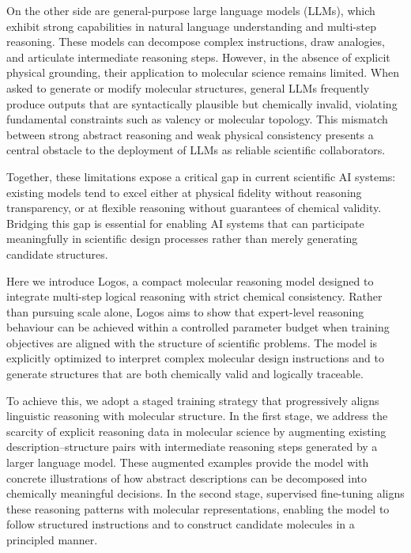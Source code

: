 \documentclass[11pt]{article}
\begin{document}
On the other side are general-purpose large language models (LLMs), which exhibit strong capabilities in natural language understanding and multi-step reasoning\cite{wei2022cot,ouyang2022instructgpt}. These models can decompose complex instructions, draw analogies, and articulate intermediate reasoning steps. However, in the absence of explicit physical grounding, their application to molecular science remains limited\cite{irwin2022chemcrow,du2024molllm}. When asked to generate or modify molecular structures, general LLMs frequently produce outputs that are syntactically plausible but chemically invalid\cite{white2023assessment}, violating fundamental constraints such as valency or molecular topology. This mismatch between strong abstract reasoning and weak physical consistency presents a central obstacle to the deployment of LLMs as reliable scientific collaborators.

Together, these limitations expose a critical gap in current scientific AI systems: existing models tend to excel either at physical fidelity without reasoning transparency, or at flexible reasoning without guarantees of chemical validity. Bridging this gap is essential for enabling AI systems that can participate meaningfully in scientific design processes rather than merely generating candidate structures.

Here we introduce Logos, a compact molecular reasoning model designed to integrate multi-step logical reasoning with strict chemical consistency. Rather than pursuing scale alone, Logos aims to show that expert-level reasoning behaviour can be achieved within a controlled parameter budget when training objectives are aligned with the structure of scientific problems. The model is explicitly optimized to interpret complex molecular design instructions and to generate structures that are both chemically valid and logically traceable.

To achieve this, we adopt a staged training strategy that progressively aligns linguistic reasoning with molecular structure\cite{edwards2021text2mol,su2023moleculestm}. In the first stage, we address the scarcity of explicit reasoning data in molecular science by augmenting existing description--structure pairs with intermediate reasoning steps generated by a larger language model. These augmented examples provide the model with concrete illustrations of how abstract descriptions can be decomposed into chemically meaningful decisions. In the second stage, supervised fine-tuning\cite{ouyang2022instructgpt} aligns these reasoning patterns with molecular representations, enabling the model to follow structured instructions and to construct candidate molecules in a principled manner.
\end{document}
